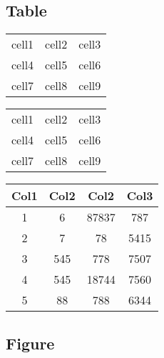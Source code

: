 \documentclass{article}
\begin{document}
\subsection{Table}
\begin{center}
\begin{tabular}{ l c r }
 cell1 & cell2 & cell3 \\ 
 cell4 & cell5 & cell6 \\  
 cell7 & cell8 & cell9    
\end{tabular}
\end{center}

\begin{center}
\begin{tabular}{ |c|c|c| } 
 \hline
 cell1 & cell2 & cell3 \\ 
 cell4 & cell5 & cell6 \\ 
 cell7 & cell8 & cell9 \\ 
 \hline
\end{tabular}
\end{center}

\begin{center}
 \begin{tabular}{||c c c c||} 
 \hline
 Col1 & Col2 & Col2 & Col3 \\ [0.5ex] 
 \hline\hline
 1 & 6 & 87837 & 787 \\ 
 \hline
 2 & 7 & 78 & 5415 \\
 \hline
 3 & 545 & 778 & 7507 \\
 \hline
 4 & 545 & 18744 & 7560 \\
 \hline
 5 & 88 & 788 & 6344 \\ [1ex] 
 \hline
\end{tabular}
\end{center}

\subsection{Figure}
\end{document}
